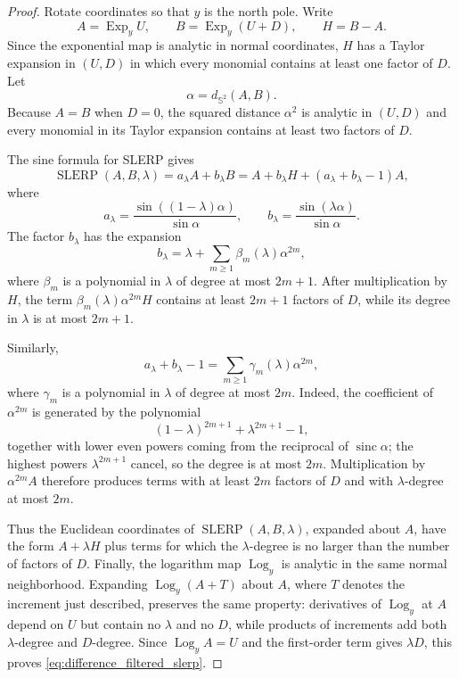 \documentclass[a4paper,11pt]{article}
\newcommand{\bS}{\mathbb{S}}
\newcommand{\Log}{\operatorname{Log}}
\newcommand{\Exp}{\operatorname{Exp}}
\newcommand{\SLERP}{\operatorname{SLERP}}
\numberwithin{equation}{section}
\begin{document}
\begin{proof}
Rotate coordinates so that \(y\) is the north pole.  Write
\[
        A=\Exp_yU,\qquad B=\Exp_y(U+D),
        \qquad H=B-A .
\]
Since the exponential map is analytic in normal coordinates, \(H\) has a
Taylor expansion in \((U,D)\) in which every monomial contains at least one
factor of \(D\).  Let
\[
        \alpha=d_{\bS^2}(A,B).
\]
Because \(A=B\) when \(D=0\), the squared distance \(\alpha^2\) is analytic in
\((U,D)\) and every monomial in its Taylor expansion contains at least two
factors of \(D\).

The sine formula for SLERP gives
\[
        \SLERP(A,B,\lambda)
        =
        a_\lambda A+b_\lambda B
        =
        A+b_\lambda H+(a_\lambda+b_\lambda-1)A,
\]
where
\[
        a_\lambda=\frac{\sin((1-\lambda)\alpha)}{\sin\alpha},
        \qquad
        b_\lambda=\frac{\sin(\lambda\alpha)}{\sin\alpha}.
\]
The factor \(b_\lambda\) has the expansion
\[
        b_\lambda
        =
        \lambda+\sum_{m\ge1}\beta_m(\lambda)\alpha^{2m},
\]
where \(\beta_m\) is a polynomial in \(\lambda\) of degree at most \(2m+1\).
After multiplication by \(H\), the term
\(\beta_m(\lambda)\alpha^{2m}H\) contains at least \(2m+1\) factors of
\(D\), while its degree in \(\lambda\) is at most \(2m+1\).

Similarly,
\[
        a_\lambda+b_\lambda-1
        =
        \sum_{m\ge1}\gamma_m(\lambda)\alpha^{2m},
\]
where \(\gamma_m\) is a polynomial in \(\lambda\) of degree at most \(2m\).
Indeed, the coefficient of \(\alpha^{2m}\) is generated by the polynomial
\[
        (1-\lambda)^{2m+1}+\lambda^{2m+1}-1,
\]
together with lower even powers coming from the reciprocal of
\(\operatorname{sinc}\alpha\); the highest powers \(\lambda^{2m+1}\) cancel,
so the degree is at most \(2m\).  Multiplication by \(\alpha^{2m}A\) therefore
produces terms with at least \(2m\) factors of \(D\) and with \(\lambda\)-degree
at most \(2m\).

Thus the Euclidean coordinates of \(\SLERP(A,B,\lambda)\), expanded about
\(A\), have the form \(A+\lambda H\) plus terms for which the
\(\lambda\)-degree is no larger than the number of factors of \(D\).  Finally,
the logarithm map \(\Log_y\) is analytic in the same normal neighborhood.
Expanding \(\Log_y(A+T)\) about \(A\), where \(T\) denotes the increment just
described, preserves the same property: derivatives of \(\Log_y\) at \(A\)
depend on \(U\) but contain no \(\lambda\) and no \(D\), while products of
increments add both \(\lambda\)-degree and \(D\)-degree.  Since
\(\Log_yA=U\) and the first-order term gives \(\lambda D\), this proves
\eqref{eq:difference_filtered_slerp}.
\end{proof}
\end{document}
